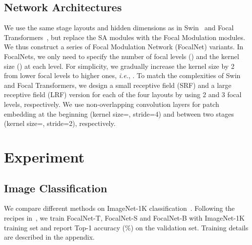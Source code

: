 \documentclass{article}
\begin{document}
\subsection{Network Architectures}
We use the same stage layouts and hidden dimensions as in Swin~\cite{liu2021swin} and Focal Transformers~\cite{yang2021focal}, but replace the SA modules with the Focal Modulation modules. We thus construct a series of Focal Modulation Network (FocalNet) variants. In FocalNets, we only need to specify the number of focal levels () and the kernel size () at each level. For simplicity, we gradually increase the kernel size by 2 from lower focal levels to higher ones, \textit{i.e.}, . To match the complexities of Swin and Focal Transformers, we design a small receptive field (SRF) and a large receptive field (LRF) version for each of the four layouts by using 2 and 3 focal levels, respectively. We use non-overlapping convolution layers for patch embedding at the beginning (kernel size=, stride=4) and between two stages (kernel size=, stride=2), respectively.


 \section{Experiment}
\vspace{-2mm}
\label{Sec:Experiment}

\subsection{Image Classification}
We compare different methods on ImageNet-1K classification~\cite{deng2009imagenet}.
Following the recipes in~\cite{touvron2020training,liu2021swin,yang2021focal}, we train FocalNet-T, FocalNet-S and FocalNet-B with ImageNet-1K training set and report Top-1 accuracy (\%) on the validation set. Training details are described in the appendix. 
\end{document}
